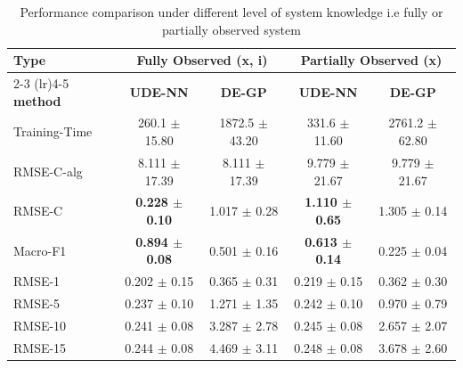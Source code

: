 \documentclass[openacc]{rsproca_new}%
\begin{document}
\begin{table}[ht]
\centering
\caption{Performance comparison under different level of system knowledge i.e fully or partially observed system}
\label{tab:partially_obs}
\small
\begin{tabular}{l cccc}
\toprule
\textbf{Type} & \multicolumn{2}{c}{\textbf{Fully Observed (x, i)}} & \multicolumn{2}{c}{\textbf{Partially Observed (x)}} \\
\cmidrule(lr){2-3} \cmidrule(lr){4-5}
\textbf{method} & \textbf{UDE-NN} & \textbf{DE-GP} & \textbf{UDE-NN} & \textbf{DE-GP} \\
\midrule
Training-Time & 260.1 $\pm$ 15.80 & 1872.5 $\pm$ 43.20 & 331.6 $\pm$ 11.60 & 2761.2 $\pm$ 62.80 \\
RMSE-C-alg & 8.111 $\pm$ 17.39 & 8.111 $\pm$ 17.39 & 9.779 $\pm$ 21.67 & 9.779 $\pm$ 21.67 \\
RMSE-C & \textbf{0.228 $\pm$ 0.10} & 1.017 $\pm$ 0.28 & \textbf{1.110 $\pm$ 0.65} & 1.305 $\pm$ 0.14 \\
Macro-F1 & \textbf{0.894 $\pm$ 0.08} & 0.501 $\pm$ 0.16 & \textbf{0.613 $\pm$ 0.14} & 0.225 $\pm$ 0.04 \\
RMSE-1 & 0.202 $\pm$ 0.15 & 0.365 $\pm$ 0.31 & 0.219 $\pm$ 0.15 & 0.362 $\pm$ 0.30 \\
RMSE-5 & 0.237 $\pm$ 0.10 & 1.271 $\pm$ 1.35 & 0.242 $\pm$ 0.10 & 0.970 $\pm$ 0.79 \\
RMSE-10 & 0.241 $\pm$ 0.08 & 3.287 $\pm$ 2.78 & 0.245 $\pm$ 0.08 & 2.657 $\pm$ 2.07 \\
RMSE-15 & 0.244 $\pm$ 0.08 & 4.469 $\pm$ 3.11 & 0.248 $\pm$ 0.08 & 3.678 $\pm$ 2.60 \\
\bottomrule
\end{tabular}
\end{table}
% 
% 
% 
% 
\end{document}
